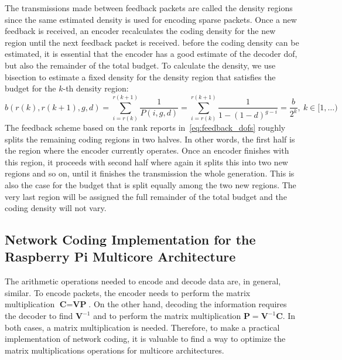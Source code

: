 The transmissions made between feedback packets are called the density
regions since the same estimated density is used for encoding sparse
packets. Once a new feedback is received, an encoder recalculates the
coding density for the new region until the next feedback packet is
received. before the coding density can be estimated, it is essential
that the encoder has a good estimate of the decoder \ac{dof}, but also
the remainder of the total budget. To calculate the density, we use
bisection to estimate a fixed density for the density region that
satisfies the budget for the $k$-th density region:
\begin{equation}
b(r(k),r(k+1),g,d) = \sum^{r(k+1)}_{i=r(k)} \frac{1}{P(i,g,d)} = \sum^{r(k+1)}_{i=r(k)} \frac{1}{1-(1-d)^{g-i}} = \frac{b}{2^k},\ k\in [1,\ldots)
\end{equation}
%
The feedback scheme based on the rank reports
in~\eqref{eq:feedback_dofs} roughly splits the remaining coding
regions in two halves. In other words, the first half is the region
where the encoder currently operates. Once an encoder finishes with
this region, it proceeds with second half where again it splits this
into two new regions and so on, until it finishes the transmission the
whole generation. This is also the case for the budget that is split
equally among the two new regions. The very last region will be
assigned the full remainder of the total budget and the coding density
will not vary.

\subsection{Network Coding Implementation for the Raspberry Pi Multicore
Architecture}
\label{sub:implementation-multicore}

The arithmetic operations needed to encode and decode data are, in
general, similar. To encode packets, the encoder needs to perform the
matrix multiplication $\textbf{C} = \textbf{V} \textbf{P}$. On the
other hand, decoding the information requires the decoder to find
$\textbf{V}^{-1}$ and to perform the matrix multiplication
$\textbf{P} = \textbf{V}^{-1} \textbf{C}$. In both cases, a matrix
multiplication is needed. Therefore, to make a practical
implementation of network coding, it is valuable to find a way to
optimize the matrix multiplications operations for multicore
architectures.

